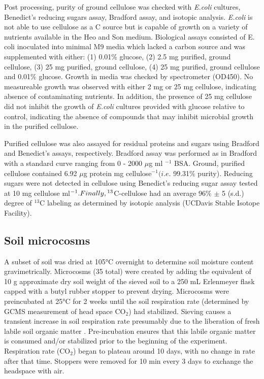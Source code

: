 \documentclass{article}
\begin{document}
Post processing, purity of ground cellulose was checked with \textit{E.coli}
cultures, Benedict's reducing sugars assay, Bradford assay, and isotopic
analysis. \textit{E.coli} is not able to use cellulose as a C source but is
capable of growth on a variety of nutrients available in the Heo and Son
medium.  Biological assays consisted of E. coli inoculated into minimal M9
media which lacked a carbon source and was supplemented with either: (1) 0.01\%
glucose, (2) 2.5 mg purified, ground cellulose, (3) 25 mg purified, ground
cellulose, (4) 25 mg purified, ground cellulose and 0.01\% glucose. Growth in
media was checked by spectrometer (OD450). No measureable growth was observed
with either 2 mg or 25 mg cellulose, indicating absence of contaminating
nutrients. In addition, the presence of 25 mg cellulose did not inhibit the
growth of \textit{E.coli} cultures provided with glucose relative to control,
indicating the absence of compounds that may inhibit microbial growth in the
purified cellulose. 

Purified cellulose was also assayed for residual proteins and sugars using
Bradford and Benedict's assays, respectively. Bradford assay was performed as
in Bradford \citep{Bradford_1976} with a standard curve ranging from 0 - 2000
$\mu$g ml $^{-1}$ BSA. Ground, purified cellulose contained 6.92
$\mu$g protein mg cellulose$^{-1} (\textit{i.e.}$ 99.31\% purity).
Reducing sugars were not detected in cellulose using Benedict's reducing sugar
assay \citep{benedict1909reagent} tested at 10 mg cellulose
ml$^{-1}. Finally, \textsuperscript{13}$C-cellulose had an average
96\% $\pm$ 5 (s.d.) degree of $^{13}$C labeling as determined by
isotopic analysis (UCDavis Stable Isotope Facility).           

\subsection{Soil microcosms}
A subset of soil was dried at 105°C overnight to determine soil moisture
content gravimetrically. Microcosms (35 total) were created by adding the
equivalent of 10 g approximate dry soil weight of the sieved soil to a 250 mL
Erlenmeyer flask capped with a butyl rubber stopper to prevent drying.
Microcosms were preincubated at 25°C for 2 weeks until the soil respiration
rate (determined by GCMS measurement of head space CO$_{2}$) had stabilized.
Sieving causes a transient increase in soil respiration rate presumably due to
the liberation of fresh labile soil organic matter \citep{Datta_2014}.
Pre-incubation ensures that this labile organic matter is consumed and/or
stabilized prior to the beginning of the experiment. Respiration rate
(CO$_{2}$) began to plateau around 10 days, with no change in rate after that
time. Stoppers were removed for 10 min every 3 days to exchange the headspace
with air. 
\end{document}
